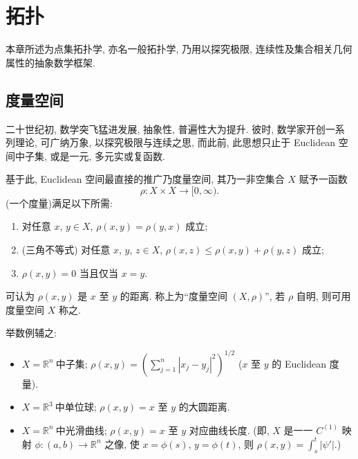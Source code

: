 \documentclass[twoside, fontset=fandol, punct=kaiming]{ctexbook}
\theoremstyle{innocent}
\begin{document}
\begin{titlepage}
\end{titlepage}




\chapter{拓扑}
本章所述为点集拓扑学, 亦名一般拓扑学, 乃用以探究极限, 连续性及集合相关几何属性的抽象数学框架.

\section{度量空间}
二十世纪初, 数学突飞猛进发展, 抽象性, 普遍性大为提升. 彼时, 数学家开创一系列理论, 可广纳万象, 以探究极限与连续之思, 而此前, 此思想只止于 Euclidean 空间中子集, 或是一元, 多元实或复函数.

基于此, Euclidean 空间最直接的推广乃度量空间, 其乃一非空集合 $X$ 赋予一函数
\[\rho :X\times X\to [0,\infty).\]
(一个度量)满足以下所需:
\begin{enumerate}
    \item 对任意 $x$, $y\in X$, $\rho (x,y)=\rho (y,x)$ 成立;
    \item (三角不等式) 对任意 $x$, $y$, $z\in X$, $\rho (x,z)\leqslant \rho (x,y)+\rho (y,z)$ 成立;
    \item $\rho (x,y)=0$ 当且仅当 $x=y$.
\end{enumerate}
可认为 $\rho (x,y)$ 是 $x$ 至 $y$ 的距离. 称上为``度量空间 $(X,\rho)$'', 若 $\rho $ 自明, 则可用度量空间 $X$ 称之.

举数例辅之:
\begin{itemize}
    \item $X=\mathbb R^n~\textit{中子集}$; $\rho (x,y) = (\sum_{j=1}^n|x_j-y_j|^2)^{1 /2}$ ($x$ 至 $y$ 的 Euclidean 度量).
    \item $X=\mathbb R^3~\textit{中单位球}$; $\rho (x,y) = \text{$x$ 至 $y$ 的大圆距离}$.
    \item $X=\mathbb R^n~\textit{中光滑曲线}$; $\rho (x,y) = \text{$x$ 至 $y$ 对应曲线长度}$. (即, $X$ 是一一 $C^{(1)}$ 映射 $\phi :(a,b)\to \mathbb R^n$ 之像, 使 $x=\phi (s)$, $y=\phi (t)$, 则 $\rho (x,y)=\int_s^t|\psi '|$.)
\end{itemize}




\end{document}
